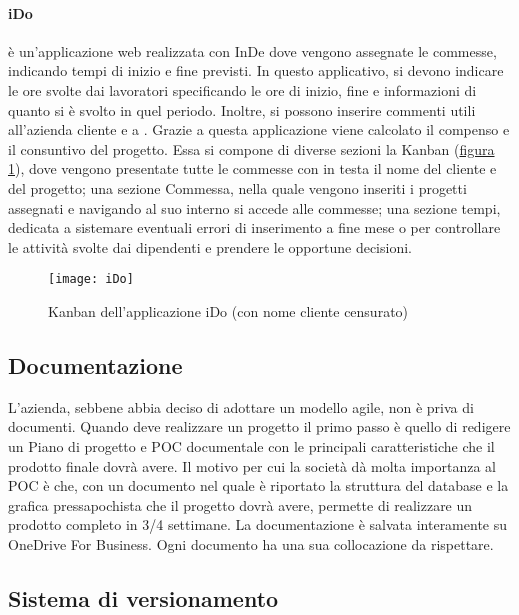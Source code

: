 \paragraph{iDo} è un'applicazione web realizzata con InDe dove vengono assegnate le commesse, indicando tempi di inizio e fine previsti. In questo applicativo, si devono indicare le ore svolte dai lavoratori specificando le ore di inizio, fine e informazioni di quanto si è svolto in quel periodo. Inoltre, si possono inserire commenti utili all'azienda cliente e a \azienda. 
Grazie a questa applicazione viene calcolato il compenso e il consuntivo del progetto. Essa si compone di diverse sezioni la Kanban (\hyperref[ido]{figura \ref{ido}}), dove vengono presentate tutte le commesse con in testa il nome del cliente e del progetto; una sezione Commessa, nella quale vengono inseriti i progetti assegnati e navigando al suo interno si accede alle commesse; una sezione tempi, dedicata a sistemare eventuali errori di inserimento a fine mese o per controllare le attività svolte dai dipendenti e prendere le opportune decisioni.

\begin{figure}[!h] 
	\centering 
	\texttt{[image: iDo]} 
	\caption{Kanban dell'applicazione iDo (con nome cliente censurato)}
	\label{ido}
\end{figure}



\subsection{Documentazione}
\label{cap1:Documentazione}

L'azienda, sebbene abbia deciso di adottare un modello agile, non è priva di documenti. Quando deve realizzare un progetto il primo passo è quello di redigere un Piano di progetto e POC documentale con le principali caratteristiche che il prodotto finale dovrà avere. 
Il motivo per cui la società dà molta importanza al POC è che, con un documento nel quale è riportato la struttura del database e la grafica pressapochista che il progetto dovrà avere, permette di realizzare un prodotto completo in 3/4 settimane. 
La documentazione è salvata interamente su OneDrive For Business. Ogni documento ha una sua collocazione da rispettare. 

\subsection{Sistema di versionamento}
\label{cap1:Sistema di versionamento}

